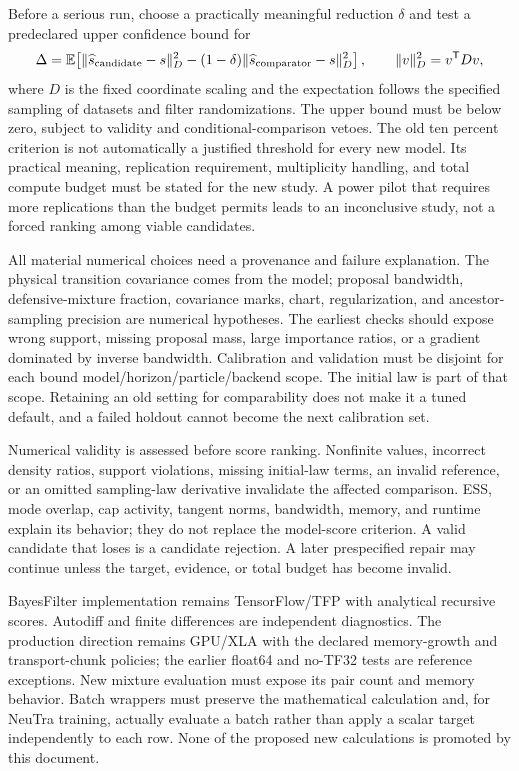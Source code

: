 \documentclass[11pt]{article}
\begin{document}
Before a serious run, choose a practically meaningful reduction $\delta$ and
test a predeclared upper confidence bound for
\begin{equation}
 \Delta=\mathbb E\!\left[
    \|\widehat s_{\rm candidate}-s\|_D^2
    -(1-\delta)\|\widehat s_{\rm comparator}-s\|_D^2\right],
 \qquad \|v\|_D^2=v^\mathsf T Dv,
 \label{eq:next-study-criterion}
\end{equation}
where $D$ is the fixed coordinate scaling and the expectation follows the
specified sampling of datasets and filter randomizations. The upper bound must be below
zero, subject to validity and conditional-comparison vetoes. The old ten
percent criterion is not automatically a justified threshold for every new
model. Its practical meaning, replication requirement, multiplicity handling,
and total compute budget must be stated for the new study. A power pilot that
requires more replications than the budget permits leads to an inconclusive
study, not a forced ranking among viable candidates.

All material numerical choices need a provenance and failure explanation.
The physical transition covariance comes from the model; proposal bandwidth,
defensive-mixture fraction, covariance marks, chart, regularization, and
ancestor-sampling precision are numerical hypotheses. The earliest checks
should expose wrong support, missing proposal mass, large importance ratios,
or a gradient dominated by inverse bandwidth. Calibration and validation
must be disjoint for each bound model/horizon/particle/backend scope. The
initial law is part of that scope. Retaining an old setting for comparability
does not make it a tuned default, and a failed holdout cannot become the next
calibration set.

Numerical validity is assessed before score ranking. Nonfinite values,
incorrect density ratios, support violations, missing initial-law terms,
an invalid reference, or an omitted sampling-law derivative invalidate the
affected comparison. ESS, mode overlap, cap activity, tangent norms, bandwidth,
memory, and runtime explain its behavior; they do not replace the model-score
criterion. A valid candidate that loses is a candidate rejection. A later
prespecified repair may continue unless the target, evidence, or total budget
has become invalid.

BayesFilter implementation remains TensorFlow/TFP with analytical recursive
scores. Autodiff and finite differences are independent diagnostics. The
production direction remains GPU/XLA with the declared memory-growth and
transport-chunk policies; the earlier float64 and no-TF32 tests are reference
exceptions. New mixture evaluation must expose its pair count and memory
behavior. Batch wrappers must preserve the mathematical calculation and,
for NeuTra training, actually evaluate a batch rather than apply a scalar
target independently to each row. None of the proposed new calculations is
promoted by this document.
\end{document}
